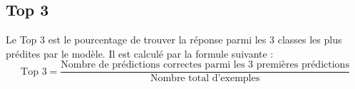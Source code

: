 \documentclass[a4paper]{article}
\begin{document}
\begin{appendices}
\subsection{Top 3}
Le Top 3 est le pourcentage de trouver la réponse parmi les 3 classes les plus prédites par le modèle. Il est calculé par la formule suivante :
\begin{equation}
    \text{Top 3} = \frac{\text{Nombre de prédictions correctes parmi les 3 premières prédictions}}{\text{Nombre total d'exemples}}
\end{equation}


\end{appendices}
\end{document}
